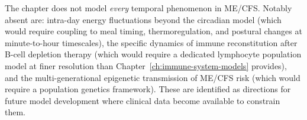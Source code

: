 The chapter does not model \emph{every} temporal phenomenon in ME/CFS. Notably absent are: intra-day energy fluctuations beyond the circadian model (which would require coupling to meal timing, thermoregulation, and postural changes at minute-to-hour timescales), the specific dynamics of immune reconstitution after B-cell depletion therapy (which would require a dedicated lymphocyte population model at finer resolution than Chapter~\ref{ch:immune-system-models} provides), and the multi-generational epigenetic transmission of ME/CFS risk (which would require a population genetics framework). These are identified as directions for future model development where clinical data become available to constrain them.
